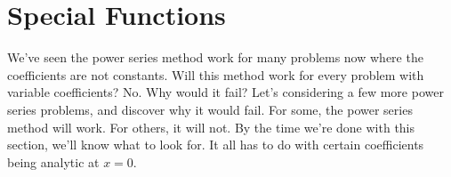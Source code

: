 % 
% 
% 
% 
 
\section{Special Functions}

We've seen the power series method work for many problems now where the coefficients are not constants.  Will this method work for every problem with variable coefficients? No. Why would it fail?  Let's considering a few more power series problems, and discover why it would fail. For some, the power series method will work.  For others, it will not.  By the time we're done with this section, we'll know what to look for.  It all has to do with certain coefficients being analytic at $x=0$. 

